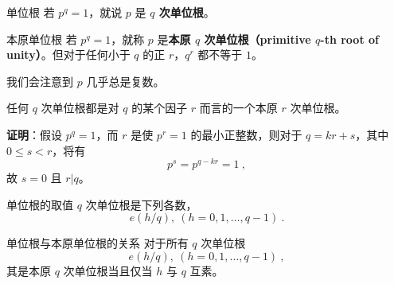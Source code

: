 

\begin{definition}{单位根}
若 $p^q=1$，就说 $p$ 是 \textbf{$q$ 次单位根}。
\end{definition}

\begin{definition}{本原单位根}
若 $p^q = 1$，就称 $p$ 是\textbf{本原 $q$ 次单位根（primitive $q$-th root of unity）}。但对于任何小于 $q$ 的正 $r$，$q^r$ 都不等于 $1$。
\end{definition}
我们会注意到 $p$ 几乎总是复数。

\begin{theorem}{}
任何 $q$ 次单位根都是对 $q$ 的某个因子 $r$ 而言的一个本原 $r$ 次单位根。
\end{theorem}
\textbf{证明}：假设 $p^q=1$，而 $r$ 是使 $p^r=1$ 的最小正整数，则对于 $q = kr+s$，其中 $0\le s < r$，将有
\begin{equation}
p^s = p^{q - kr} = 1~,
\end{equation}
故 $s=0$ 且 $r | q$。

\begin{theorem}{单位根的取值}
$q$ 次单位根是下列各数，
\begin{equation}
e\left( h/q \right), ~ (h = 0, 1, \dots, q-1) ~.
\end{equation}

\end{theorem}

\begin{theorem}{单位根与本原单位根的关系}
对于所有 $q$ 次单位根
\begin{equation}
e(h/q), ~(h = 0, 1, \dots, q-1) ~,
\end{equation}
其是本原 $q$ 次单位根当且仅当 $h$ 与 $q$ 互素。
\end{theorem}
